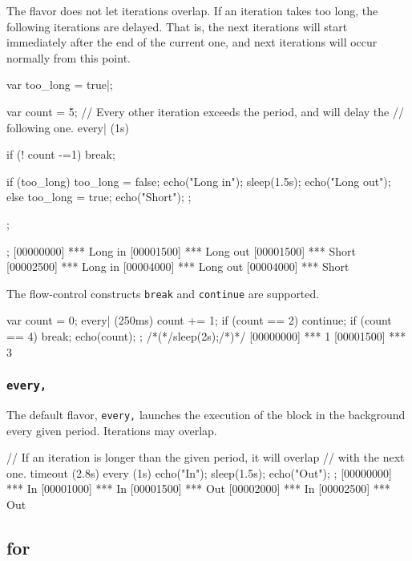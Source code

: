 The  flavor does not let iterations overlap. If an
iteration takes too long, the following iterations are delayed. That
is, the next iterations will start immediately after the end of the
current one, and next iterations will occur normally from this point.

\begin{urbiscript}
{
  var too_long = true|;

  var count = 5;
  // Every other iteration exceeds the period, and will delay the
  // following one.
  every| (1s)
  {
    if (! count -=1)
      break;

    if (too_long)
    {
      too_long = false;
      echo("Long in");
      sleep(1.5s);
      echo("Long out");
    }
    else
    {
      too_long = true;
      echo("Short");
    };
  };
};
[00000000] *** Long in
[00001500] *** Long out
[00001500] *** Short
[00002500] *** Long in
[00004000] *** Long out
[00004000] *** Short
\end{urbiscript}

The flow-control constructs \lstinline|break| and \lstinline|continue|
are supported.

\begin{urbiscript}
{
  var count = 0;
  every| (250ms)
  {
    count += 1;
    if (count == 2)
      continue;
    if (count == 4)
      break;
    echo(count);
  }
};
/*(*/sleep(2s);/*)*/
[00000000] *** 1
[00001500] *** 3
\end{urbiscript}


\subsubsection{\lstinline'every,'}
The default flavor, \lstinline|every,| launches the execution of the
block in the background every given period. Iterations may overlap.

\begin{urbiscript}[firstnumber=1]
// If an iteration is longer than the given period, it will overlap
// with the next one.
timeout (2.8s)
  every (1s)
  {
    echo("In");
    sleep(1.5s);
    echo("Out");
  };
[00000000] *** In
[00001000] *** In
[00001500] *** Out
[00002000] *** In
[00002500] *** Out
\end{urbiscript}

\subsection{for}

